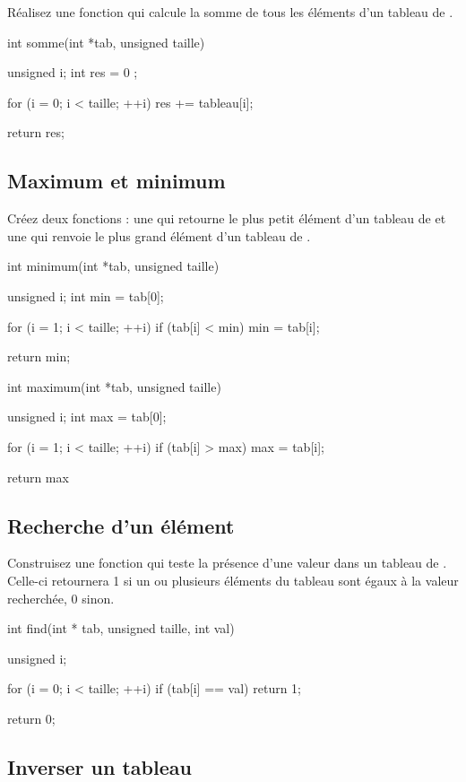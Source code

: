Réalisez une fonction qui calcule la somme de tous les éléments d'un
tableau de .

\begin{C}
 int somme(int *tab, unsigned taille)
{
    unsigned i;
    int res = 0 ;

    for (i = 0; i < taille; ++i)
        res += tableau[i];

    return res;
}
\end{C}

\subsection{Maximum et minimum}
\label{maximum-et-minimum}

Créez deux fonctions : une qui retourne le plus petit élément d'un
tableau de  et une qui renvoie le plus grand élément d'un
tableau de .

\begin{C}
 int minimum(int *tab, unsigned taille)
{
    unsigned i;
    int min = tab[0];

    for (i = 1; i < taille; ++i)
        if (tab[i] < min)
            min = tab[i];

    return min;
}


int maximum(int *tab, unsigned taille)
{
    unsigned i;
    int max = tab[0];

    for (i = 1; i < taille; ++i)
        if (tab[i] > max)
            max = tab[i];

    return max
}
\end{C}

\subsection{Recherche d'un élément}
\label{recherche-dun-element}

Construisez une fonction qui teste la présence d'une valeur dans un
tableau de . Celle-ci retournera 1 si un ou plusieurs
éléments du tableau sont égaux à la valeur recherchée, 0 sinon.

\begin{C}
 int find(int * tab, unsigned taille, int val)
{
    unsigned i;

    for (i = 0; i < taille; ++i)
        if (tab[i] == val) 
            return 1;

    return 0;
}
\end{C}

\subsection{Inverser un tableau}
\label{inverser-un-tableau}

